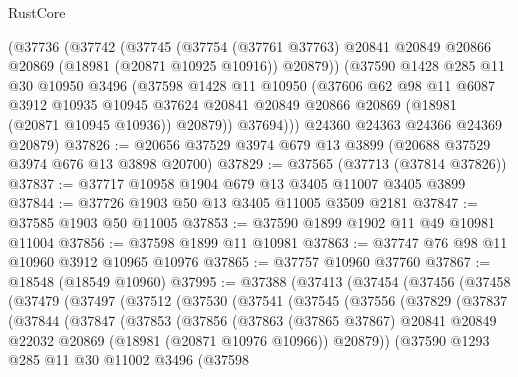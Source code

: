 \begin{lexlean}{RustCore}
\begin{coremodule}
      (@37736
        (@37742
          (@37745
            (@37754
              (@37761 @37763)
              @20841
              @20849
              @20866
              @20869
              (@18981 (@20871 @10925 @10916))
              @20879))
          (@37590
            @1428
            @285
            @11
            @30
            @10950
            @3496
            (@37598
              @1428
              @11
              @10950
              (@37606
                @62
                @98
                @11
                @6087
                @3912
                @10935
                @10945
                @37624
                @20841
                @20849
                @20866
                @20869
                (@18981 (@20871 @10945 @10936))
                @20879))
            @37694)))
      @24360
      @24363
      @24366
      @24369
      @20879)
@37826 := @20656 @37529 @3974 @679 @13 @3899 (@20688 @37529 @3974 @676 @13 @3898 @20700)
@37829 := @37565 (@37713 (@37814 @37826))
@37837 := @37717 @10958 @1904 @679 @13 @3405 @11007 @3405 @3899
@37844 := @37726 @1903 @50 @13 @3405 @11005 @3509 @2181
@37847 := @37585 @1903 @50 @11005
@37853 := @37590 @1899 @1902 @11 @49 @10981 @11004
@37856 := @37598 @1899 @11 @10981
@37863 := @37747 @76 @98 @11 @10960 @3912 @10965 @10976
@37865 := @37757 @10960 @37760
@37867 := @18548 (@18549 @10960)
@37995 := @37388
    (@37413
      (@37454
        (@37456
          (@37458
            (@37479
              (@37497
                (@37512
                  (@37530
                    (@37541
                      (@37545
                        (@37556
                          (@37829
                            (@37837
                              (@37844
                                (@37847
                                  (@37853
                                    (@37856
                                      (@37863
                                        (@37865 @37867)
                                        @20841
                                        @20849
                                        @22032
                                        @20869
                                        (@18981 (@20871 @10976 @10966))
                                        @20879))
                                    (@37590
                                      @1293
                                      @285
                                      @11
                                      @30
                                      @11002
                                      @3496
                                      (@37598

\end{coremodule}
\end{lexlean}
